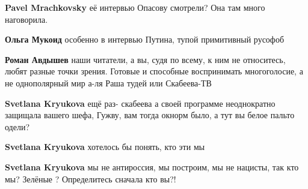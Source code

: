 \begin{itemize}
\begin{itemize}
\textbf{Pavel Mrachkovsky} её интервью Опасову смотрели? Она там много наговорила.

 
\textbf{Ольга Мукоид} особенно в интервью Путина, тупой примитивный русофоб


 
\textbf{Роман Авдышев} наши читатели, а вы, судя по всему, к ним не относитесь, любят разные точки зрения. Готовые и способные воспринимать многоголосие, а не однополярный мир а-ля Раша тудей или Скабеева-ТВ

 
\textbf{Svetlana Kryukova} ещё раз- скабеева а своей программе неоднократно защищала вашего шефа, Гужву, вам тогда окнорм было, а тут вы белое пальто одели?

 
\textbf{Svetlana Kryukova} хотелось бы понять, кто эти мы

 
\textbf{Svetlana Kryukova} мы не антироссия, мы построим, мы не нацисты, так кто мы? Зелёные ? Определитесь сначала кто вы?!

 

\end{itemize}
\end{itemize}
